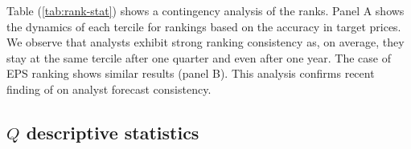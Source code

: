 \documentclass{book}
\begin{document}
Table (\ref{tab:rank-stat}) shows a contingency analysis of the ranks. 
Panel A shows the dynamics of each tercile for rankings based on the accuracy in target prices. We observe that analysts exhibit strong ranking consistency as, on average, they stay at the same tercile after one quarter and even after one year. The case of EPS ranking shows similar results (panel B). This analysis confirms recent finding of \cite{hilary2013} on analyst forecast consistency. 






\subsection{$Q$ descriptive statistics}
\end{document}
